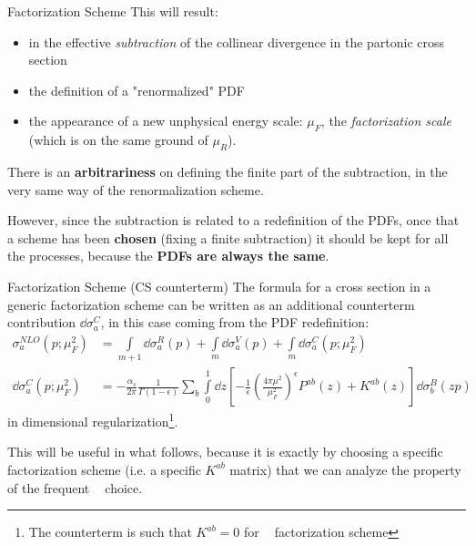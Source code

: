 \documentclass[9pt]{beamer}
\DeclareMathOperator{\msbar}{\overline{MS}}
\begin{document}
\begin{frame}{Factorization Scheme}
    This will result:
    \begin{itemize}
        \item in the effective \textit{subtraction} of the collinear divergence
            in the partonic cross section
        \item the definition of a "renormalized" PDF
        \item the appearance of a new unphysical energy scale: $\mu_F$, the
            \textit{factorization scale} (which is on the same ground of $\mu_R$).
    \end{itemize}

    There is an \textbf{arbitrariness} on defining the finite part of the
    subtraction, in the very same way of the renormalization scheme.

    However, since the subtraction is related to a redefinition of the PDFs,
    once that a scheme has been \textbf{chosen} (fixing a finite subtraction)
    it should be kept for all the processes, because the \textbf{PDFs are
    always the same}.
\end{frame}

\begin{frame}{Factorization Scheme (CS counterterm)}
    The formula for a cross section in a generic factorization scheme can be
    written as an additional counterterm contribution $\dd\sigma^C_a$, in this
    case coming from the PDF redefinition:
    \begin{align*}
        \sigma_a^{NLO}(p; \mu_F^2) &= \int\limits_{m+1} \dd\sigma^R_a(p) +
        \int\limits_{m} \dd\sigma^V_a(p) + \int\limits_{m} \dd\sigma^C_a(p;
        \mu_F^2)\\
        \dd\sigma^C_a(p;\mu_F^2) &= - \frac{\alpha_s}{2\pi}
        \frac{1}{\Gamma(1-\epsilon)} \sum_b \int\limits_0^1 \dd z \left[ -
        \frac{1}{\epsilon} \left(\frac{4\pi\mu^2}{\mu_F^2}\right)^\epsilon
        P^{ab}(z) + K^{ab}(z) \right] \dd \sigma_b^B(zp)
    \end{align*}
    in dimensional regularization\footnote{The counterterm is such that
    $K^{ab}=0$ for $\msbar$ factorization scheme}.

    This will be useful in what follows, because it is exactly by choosing a
    specific factorization scheme (i.e. a specific $K^{ab}$ matrix) that we can
    analyze the property of the frequent $\msbar$ choice.
\end{frame}
\end{document}
